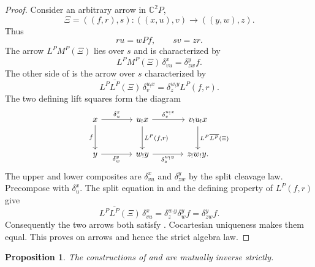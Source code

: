 \documentclass[11pt]{article}
\theoremstyle{plain}
\newtheorem{proposition}[theorem]{Proposition}
\theoremstyle{definition}
\theoremstyle{remark}
\newcommand{\C}{\mathbb{C}}
\numberwithin{equation}{section}
\begin{document}
\begin{proof}
Consider an arbitrary arrow in $\C^2P$,
\begin{equation}
\Xi=((f,r),s)
  \colon((x,u),v)\longrightarrow((y,w),z).
  \label{eq:Xi}
\end{equation}
Thus
\begin{equation}
ru=wPf,
  \qquad
  sv=zr.
  \label{eq:Xi-relations}
\end{equation}
The arrow $L^{P}M^{P}(\Xi)$ lies over $s$ and is characterized by
\begin{equation}
L^{P}M^{P}(\Xi)\,\delta^{x}_{vu}
  =\delta^{y}_{zw}f.
  \label{eq:LM-characterization}
\end{equation}
The other side of  is the arrow over $s$
characterized by
\begin{equation}
L^{P}\overline{L^{P}}(\Xi)\,
  \delta^{u_{!}x}_{v}
  =\delta^{w_{!}y}_{z}L^{P}(f,r).
  \label{eq:LL-characterization}
\end{equation}
The two defining lift squares form the diagram
\begin{equation}
\begin{tikzcd}[column sep=large,row sep=large]
x \arrow[r,"\delta^x_u"] \arrow[d,"f"']
& u_!x \arrow[r,"\delta^{u_!x}_v"]
  \arrow[d,"{L^P(f,r)}"]
& v_!u_!x \arrow[d,"{L^P\overline{L^P}(\Xi)}"] \\
y \arrow[r,"\delta^y_w"']
& w_!y \arrow[r,"\delta^{w_!y}_z"']
& z_!w_!y .
\end{tikzcd}
\label{eq:LP-multiplication-diagram}
\end{equation}
The upper and lower composites are $\delta^x_{vu}$ and
$\delta^y_{zw}$ by the split cleavage law.
Precompose  with $\delta^{x}_{u}$.
The split equation in  and the defining property of
$L^{P}(f,r)$ give
\begin{equation*}
L^{P}\overline{L^{P}}(\Xi)\,\delta^{x}_{vu}
  =\delta^{w_{!}y}_{z}\delta^{y}_{w}f
  =\delta^{y}_{zw}f.
\end{equation*}
Consequently the two arrows both satisfy
.  Cocartesian uniqueness makes them
equal.  This proves  on arrows and hence the
strict algebra law.
\end{proof}

\begin{proposition}\label{prop:object-inverses}
The constructions of  and
 are mutually inverse strictly.
\end{proposition}
\end{document}
